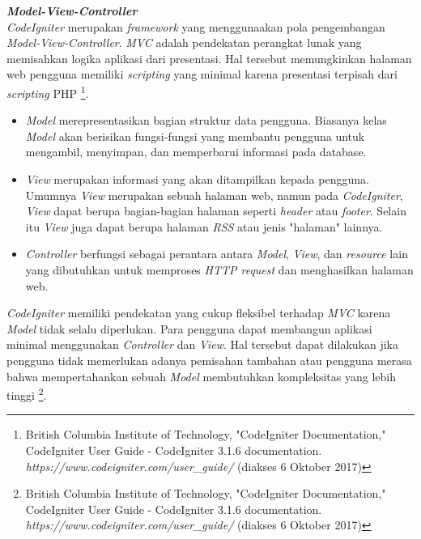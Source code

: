 \documentclass[a4paper,twoside]{article}
\begin{document}
\begin{enumerate}
\begin{enumerate}
			\textbf{\textit{Model-View-Controller}} \\
			\textit{CodeIgniter} merupakan \textit{framework} yang menggunaakan pola pengembangan \textit{Model-View-Controller}. \textit{MVC} adalah pendekatan perangkat lunak yang memisahkan logika aplikasi dari presentasi. Hal tersebut memungkinkan halaman web pengguna memiliki \textit{scripting} yang minimal karena presentasi terpisah dari \textit{scripting} PHP \footnote{British Columbia Institute of Technology, "CodeIgniter Documentation," CodeIgniter User Guide - CodeIgniter 3.1.6 documentation. \textit{https://www.codeigniter.com/user\_guide/} (diakses 6 Oktober 2017)}. 
			\begin{itemize}
				\item \textit{Model} merepresentasikan bagian struktur data pengguna. Biasanya kelas \textit{Model} akan berisikan fungsi-fungsi yang membantu pengguna untuk mengambil, menyimpan, dan memperbarui informasi pada database.
				\item \textit{View} merupakan informasi yang akan ditampilkan kepada pengguna. Umumnya \textit{View} merupakan sebuah halaman web, namun pada \textit{CodeIgniter}, \textit{View} dapat berupa bagian-bagian halaman seperti \textit{header} atau \textit{footer}. Selain itu \textit{View} juga dapat berupa halaman \textit{RSS} atau jenis "halaman" lainnya.
				\item \textit{Controller} berfungsi sebagai perantara antara \textit{Model}, \textit{View}, dan \textit{resource} lain yang dibutuhkan untuk memproses \textit{HTTP request} dan menghasilkan halaman web.
			\end{itemize}
			\textit{CodeIgniter} memiliki pendekatan yang cukup fleksibel terhadap \textit{MVC} karena \textit{Model} tidak selalu diperlukan. Para pengguna dapat membangun aplikasi minimal  menggunakan \textit{Controller} dan \textit{View}. Hal tersebut dapat dilakukan jika pengguna tidak memerlukan adanya pemisahan tambahan atau pengguna merasa bahwa mempertahankan sebuah \textit{Model} membutuhkan kompleksitas yang lebih tinggi \footnote{British Columbia Institute of Technology, "CodeIgniter Documentation," CodeIgniter User Guide - CodeIgniter 3.1.6 documentation. \textit{https://www.codeigniter.com/user\_guide/} (diakses 6 Oktober 2017)}. 
			

\end{enumerate}
\end{enumerate}
\end{document}
